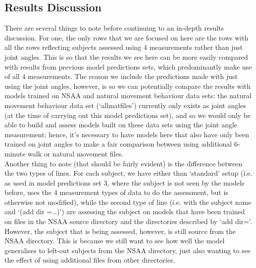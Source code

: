 \documentclass[12pt,twoside]{report}
\begin{document}
\subsection{Results Discussion}

\quad There are several things to note before continuing to an in-depth results discussion. For one, the only rows that we are focused on here are the rows with all the rows reflecting subjects assessed using 4 measurements rather than just joint angles. This is so that the results we see here can be more easily compared with results from previous model predictions sets, which predominantly make use of all 4 measurements. The reason we include the predictions made with just using the joint angles, however, is so we can potentially compare the results with models trained on NSAA and natural movement behaviour data sets: the natural movement behaviour data set (‘allmatfiles’) currently only exists as joint angles (at the time of carrying out this model predictions set), and so we would only be able to build and assess models built on these data sets using the joint angle measurement; hence, it’s necessary to have models here that also have only been trained on joint angles to make a fair comparison between using additional 6-minute walk or natural movement files.\\

\quad Another thing to note (that should be fairly evident) is the difference between the two types of lines. For each subject, we have either than ‘standard’ setup (i.e. as used in model predictions set 3, where the subject is not seen by the models before, uses the 4 measurement types of data to do the assessment, but is otherwise not modified), while the second type of line (i.e. with the subject name and ‘(add dir =…)’) are assessing the subject on models that have been trained on files in the NSAA source directory and the directories described by ‘add dir=’. However, the subject that is being assessed, however, is still source from the NSAA directory. This is because we still want to see how well the model generalises to left-out subjects from the NSAA directory, just also wanting to see the effect of using additional files from other directories.\\
\end{document}
